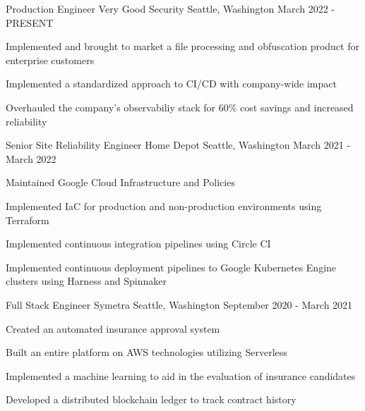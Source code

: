 


\begin{cventries}

\cventry
{Production Engineer} %
{Very Good Security} %
{Seattle, Washington} %
{March 2022 - PRESENT} %
{ %
\begin{cvitems}
\item{Implemented and brought to market a file processing and obfuscation product for enterprise customers}
\item{Implemented a standardized approach to CI/CD with company-wide impact}
\item{Overhauled the company's observabiliy stack for 60\% cost savings and increased reliability}
\end{cvitems}
}


\cventry
{Senior Site Reliability Engineer} %
{Home Depot} %
{Seattle, Washington} %
{March 2021 - March 2022} %
{ %
\begin{cvitems}
\item {Maintained Google Cloud Infrastructure and Policies}
\item {Implemented IaC for production and non-production environments using Terraform}
\item {Implemented continuous integration pipelines using Circle CI}
\item {Implemented continuous deployment pipelines to Google Kubernetes Engine clusters using Harness and Spinnaker}
\end{cvitems}
}


\cventry
{Full Stack Engineer} %
{Symetra} %
{Seattle, Washington} %
{September 2020 - March 2021} %
{ %
\begin{cvitems}
\item {Created an automated insurance approval system}
\item {Built an entire platform on AWS technologies utilizing Serverless}
\item {Implemented a machine learning to aid in the evaluation of insurance candidates}
\item {Developed a distributed blockchain ledger to track contract history}
\end{cvitems}
}


\end{cventries}
